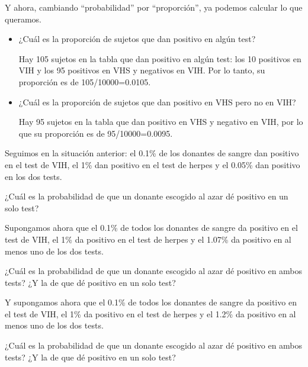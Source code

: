 \documentclass[
]{book}
\theoremstyle{definition}
\theoremstyle{definition}
\theoremstyle{definition}
\theoremstyle{definition}
\theoremstyle{remark}
\begin{document}
Y ahora, cambiando ``probabilidad'' por ``proporción'', ya podemos calcular lo que queramos.

\begin{itemize}
\item
  ¿Cuál es la proporción de sujetos que dan positivo en algún test?

  Hay 105 sujetos en la tabla que dan positivo en algún test: los 10 positivos en VIH y los 95 positivos en VHS y negativos en VIH. Por lo tanto, su proporción es de 105/10000=0.0105.
\item
  ¿Cuál es la proporción de sujetos que dan positivo en VHS pero no en VIH?

  Hay 95 sujetos en la tabla que dan positivo en VHS y negativo en VIH, por lo que su proporción es de 95/10000=0.0095.
\end{itemize}

\begin{rmdexercici}
Seguimos en la situación anterior: el 0.1\% de los donantes de sangre dan positivo en el test de VIH, el 1\% dan positivo en el test de herpes y el 0.05\% dan positivo en los dos tests.

¿Cuál es la probabilidad de que un donante escogido al azar dé positivo en un solo test?
\end{rmdexercici}

\begin{rmdexercici}
Supongamos ahora que el 0.1\% de todos los donantes de sangre da positivo en el test de VIH, el 1\% da positivo en el test de herpes y el 1.07\% da positivo en al menos uno de los dos tests.

¿Cuál es la probabilidad de que un donante escogido al azar dé positivo en ambos tests? ¿Y la de que dé positivo en un solo test?
\end{rmdexercici}

\begin{rmdexercici}
Y supongamos ahora que el 0.1\% de todos los donantes de sangre da positivo en el test de VIH, el 1\% da positivo en el test de herpes y el 1.2\% da positivo en al menos uno de los dos tests.

¿Cuál es la probabilidad de que un donante escogido al azar dé positivo en ambos tests? ¿Y la de que dé positivo en un solo test?
\end{rmdexercici}
\end{document}
